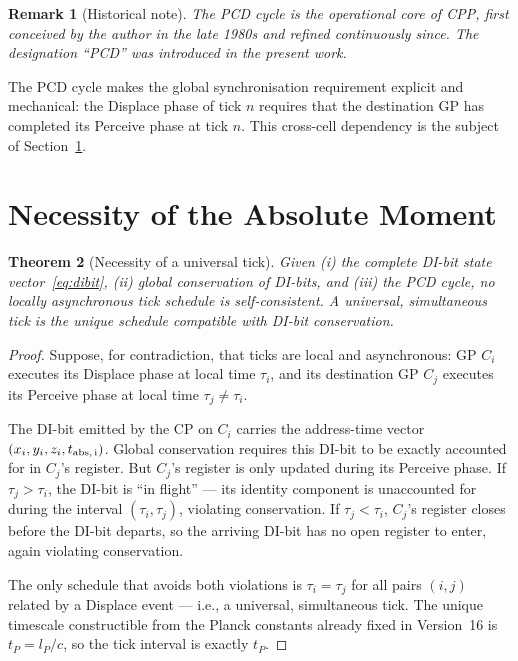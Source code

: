 \documentclass[12pt]{article}
\newtheorem{theorem}{Theorem}[section]
\newtheorem{remark}[theorem]{Remark}
\begin{document}
\begin{remark}[Historical note]
The PCD cycle is the operational core of CPP, first conceived by the author
in the late 1980s and refined continuously since.  The designation
``PCD'' was introduced in the present work.
\end{remark}

The PCD cycle makes the global synchronisation requirement explicit and
mechanical: the Displace phase of tick $n$ requires that the destination GP
has completed its Perceive phase at tick $n$.  This cross-cell dependency is
the subject of Section~\ref{sec:necessity}.

\section{Necessity of the Absolute Moment}
\label{sec:necessity}

\begin{theorem}[Necessity of a universal tick]
\label{thm:necessity}
Given (i) the complete DI-bit state vector~\eqref{eq:dibit}, (ii) global
conservation of DI-bits, and (iii) the PCD cycle, no locally asynchronous
tick schedule is self-consistent.  A universal, simultaneous tick is the
unique schedule compatible with DI-bit conservation.
\end{theorem}

\begin{proof}
Suppose, for contradiction, that ticks are local and asynchronous: GP
$C_i$ executes its Displace phase at local time $\tau_i$, and its destination
GP $C_j$ executes its Perceive phase at local time $\tau_j \ne \tau_i$.

The DI-bit emitted by the CP on $C_i$ carries the address-time vector
$(x_i, y_i, z_i, t_{\rm abs,\,i})$.  Global conservation requires this
DI-bit to be exactly accounted for in $C_j$'s register.  But $C_j$'s
register is only updated during its Perceive phase.  If $\tau_j > \tau_i$,
the DI-bit is ``in flight'' --- its identity component is unaccounted for
during the interval $(\tau_i, \tau_j)$, violating conservation.  If
$\tau_j < \tau_i$, $C_j$'s register closes before the DI-bit departs, so
the arriving DI-bit has no open register to enter, again violating
conservation.

The only schedule that avoids both violations is $\tau_i = \tau_j$ for all
pairs $(i, j)$ related by a Displace event --- i.e., a universal, simultaneous
tick.  The unique timescale constructible from the Planck constants already
fixed in Version~16 is $t_P = l_P/c$, so the tick interval is exactly $t_P$.
\end{proof}
\end{document}
